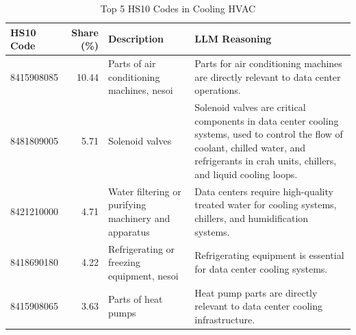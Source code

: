 \begin{table}[htbp]
\centering
\caption{Top 5 HS10 Codes in Cooling HVAC}
\label{tab:top5_cooling_hvac}
\begin{tabular}{lrp{5.5cm}p{5.5cm}}
\toprule
HS10 Code & Share (\%) & Description & LLM Reasoning \\
\midrule
8415908085 & 10.44 & {\footnotesize Parts of air conditioning machines, nesoi} & {\footnotesize Parts for air conditioning machines are directly relevant to data center operations.} \\
8481809005 & 5.71 & {\footnotesize Solenoid valves} & {\footnotesize Solenoid valves are critical components in data center cooling systems, used to control the flow of coolant, chilled water, and refrigerants in crah units, chillers, and liquid cooling loops.} \\
8421210000 & 4.71 & {\footnotesize Water filtering or purifying machinery and apparatus} & {\footnotesize Data centers require high-quality treated water for cooling systems, chillers, and humidification systems.} \\
8418690180 & 4.22 & {\footnotesize Refrigerating or freezing equipment, nesoi} & {\footnotesize Refrigerating equipment is essential for data center cooling systems.} \\
8415908065 & 3.63 & {\footnotesize Parts of heat pumps} & {\footnotesize Heat pump parts are directly relevant to data center cooling infrastructure.} \\
\bottomrule
\end{tabular}
\end{table}
